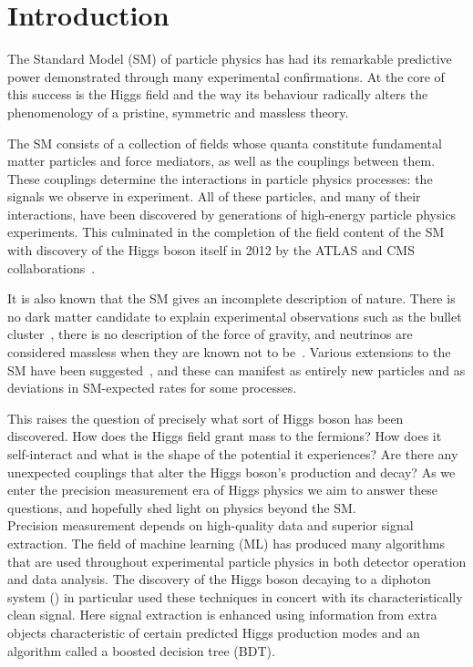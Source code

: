 \chapter{Introduction}
\label{chap:intro}

The Standard Model (SM) of particle physics has had its remarkable predictive power demonstrated through many experimental confirmations. 
At the core of this success is the Higgs field and the way its behaviour radically alters the phenomenology of a pristine, symmetric and massless theory.

The SM consists of a collection of fields whose quanta constitute fundamental matter particles and force mediators, as well as the couplings between them. 
These couplings determine the interactions in particle physics processes: the signals we observe in experiment. 
All of these particles, and many of their interactions, have been discovered by generations of high-energy particle physics experiments. 
This culminated in the completion of the field content of the SM with discovery of the Higgs boson itself in 2012 by the ATLAS and CMS collaborations~\cite{ATLAS_Higgs_disc,CMS_Higgs_disc}. 

It is also known that the SM gives an incomplete description of nature. 
There is no dark matter candidate to explain experimental observations such as the bullet cluster~\cite{BulletCluster}, there is no description of the force of gravity, 
and neutrinos are considered massless when they are known not to be~\cite{NeutrinoOscillation}. 
Various extensions to the SM have been suggested~\cite{BSM}, and these can manifest as entirely new particles and as deviations in SM-expected rates for some processes. 

This raises the question of precisely what sort of Higgs boson has been discovered. How does the Higgs field grant mass to the fermions? 
How does it self-interact and what is the shape of the potential it experiences? Are there any unexpected couplings that alter the Higgs boson's production and decay?
As we enter the precision measurement era of Higgs physics we aim to answer these questions, and hopefully shed light on physics beyond the SM.
\\

Precision measurement depends on high-quality data and superior signal extraction.
The field of machine learning (ML) has produced many algorithms that are used throughout experimental particle physics in both detector operation and data analysis. 
The discovery of the Higgs boson decaying to a diphoton system (\Hgg) in particular used these techniques in concert with its characteristically clean signal. 
Here signal extraction is enhanced using information from extra objects characteristic of certain predicted Higgs production modes and an algorithm called a boosted decision tree (BDT). 

